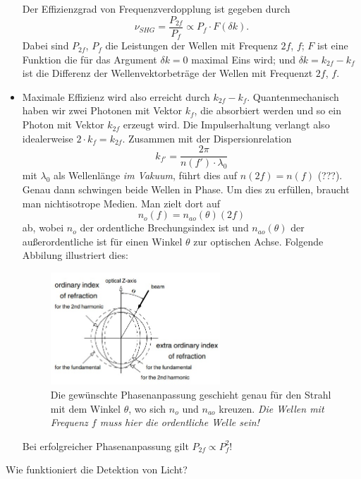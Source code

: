 \documentclass{subfiles}
\begin{document}
\begin{Antwort}
\begin{itemize}[label=$\to$]
            Der Effizienzgrad von Frequenzverdopplung ist gegeben durch 
            \[
                \nu_{SHG} = \frac{P_{2f}}{P_f} \propto P_f\cdot  F(\delta k).    
            \]
            Dabei sind $P_{2f}$, $P_f$ die Leistungen der Wellen mit Frequenz $2f$, $f$; $F$ ist eine Funktion die für das Argument $\delta k=0$ maximal Eins wird; und $\delta k = k_{2f} - k_f$ ist die Differenz der Wellenvektorbeträge der Wellen mit Frequenzt $2f$, $f$. 
        
            \item Maximale Effizienz wird also erreicht durch $k_{2f} - k_f$. Quantenmechanisch haben wir zwei Photonen mit Vektor $k_f$, die absorbiert werden und so ein Photon mit Vektor $k_{2f}$ erzeugt wird. Die Impulserhaltung verlangt also idealerweise $2\cdot k_f = k_{2f}$. Zusammen mit der Dispersionrelation
            \[
                k_{f'} = \frac{2\pi}{n(f')\cdot\lambda_0}    
            \]
            mit $\lambda_0$ als Wellenlänge \textit{im Vakuum}, führt dies auf $n(2f) = n(f)$ (???). Genau dann schwingen beide Wellen in Phase. Um dies zu erfüllen, braucht man nichtisotrope Medien. Man zielt dort auf
            \[
                n_o(f) = n_{ao}(\theta)(2f)    
            \]
            ab, wobei $n_o$ der ordentliche Brechungsindex ist und $n_{ao}(\theta)$ der außerordentliche ist für einen Winkel $\theta$  zur optischen Achse. Folgende Abbilung illustriert dies:
            
            \begin{figure}[H]
                \centering
                \includegraphics[width=0.6\textwidth]{Bilddateien/Phasenanpassung (Doppelbrechender Kristall).jpg}
                \caption{Die gewünschte Phasenanpassung geschieht genau für den Strahl mit dem Winkel $\theta$, wo sich $n_o$ und $n_{ao}$ kreuzen. \textit{Die Wellen mit Frequenz $f$ muss hier die ordentliche Welle sein!}}
            \end{figure}

            Bei erfolgreicher Phasenanpassung gilt $P_{2f}\propto P_f^2$!
        \end{itemize}
    \end{Antwort}

    \begin{Frage}
        Wie funktioniert die Detektion von Licht?
    \end{Frage}
    \begin{Antwort}
        
    \end{Antwort}
\end{document}

